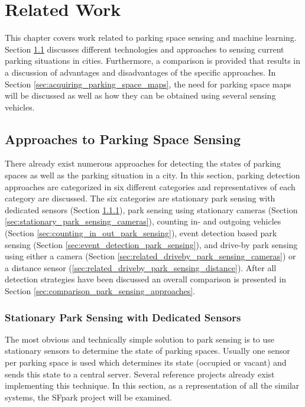 \chapter{Related Work}
\label{chap:relatedwork}

This chapter covers work related to parking space sensing and machine learning. Section \ref{sec:parksensing} discusses different technologies and approaches to sensing current parking situations in cities. Furthermore, a comparison is provided that results in a discussion of advantages and disadvantages of the specific approaches. In Section \ref{sec:acquiring_parking_space_maps}, the need for parking space maps will be discussed as well as how they can be obtained using several sensing vehicles.



\section{Approaches to Parking Space Sensing}
\label{sec:parksensing}

There already exist numerous approaches for detecting the states of parking spaces as well as the parking situation in a city. In this section, parking detection approaches are categorized in six different categories and representatives of each category are discussed. The six categories are stationary park sensing with dedicated sensors (Section \ref{sec:stationary_park_sensing}), park sensing using stationary cameras (Section \ref{sec:stationary_park_sensing_cameras}), counting in- and outgoing vehicles (Section \ref{sec:counting_in_out_park_sensing}), event detection based park sensing (Section \ref{sec:event_detection_park_sensing}), and drive-by park sensing using either a camera (Section \ref{sec:related_driveby_park_sensing_cameras}) or a distance sensor (\ref{sec:related_driveby_park_sensing_distance}). After all detection strategies have been discussed an overall comparison is presented in Section \ref{sec:comparison_park_sensing_approaches}.



\subsection{Stationary Park Sensing with Dedicated Sensors}
\label{sec:stationary_park_sensing}

The most obvious and technically simple solution to park sensing is to use stationary sensors to determine the state of parking spaces. Usually one sensor per parking space is used which determines its state (occupied or vacant) and sends this state to a central server. Several reference projects already exist implementing this technique\cite{SFPark, VehicleSense}. In this section, as a representation of all the similar systems, the SFpark project will be examined.

